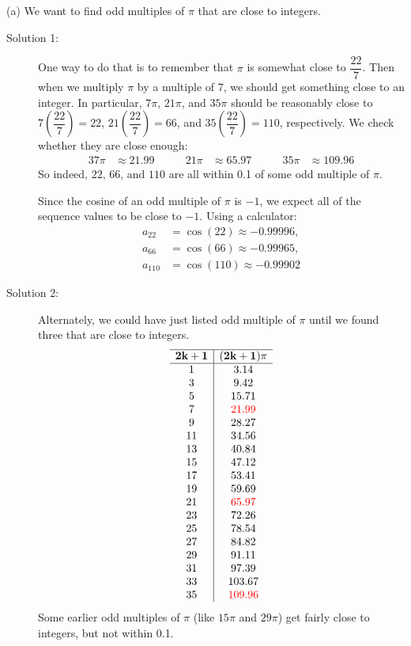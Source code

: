 \begin{solution}
\noindent (a) We want to find odd multiples of $\pi$ that are close to integers.
\begin{description}\item[Solution 1:]
One way to do that is to remember that $\pi$ is somewhat close to $\dfrac{22}{7}$. Then when we multiply $\pi$ by a multiple of 7, we should get something close to an integer. In particular, $7\pi$, $21\pi$, and $35\pi$ should be reasonably close to $7\left(\dfrac{22}{7}\right)=22$, $21\left(\dfrac{22}{7}\right)=66$, and $35\left(\dfrac{22}{7}\right)=110$, respectively. We check whether they are close enough:
\begin{alignat*}{3}
7\pi&\approx 21.99 &\qquad 21\pi &\approx 65.97 & \qquad 35\pi &\approx 109.96
\end{alignat*}
So indeed, $22$, $66$, and $110$ are all within 0.1 of some odd multiple of $\pi$.

Since the cosine of an odd multiple of $\pi$ is $-1$, we expect all of the sequence values to be close to $-1$. Using a calculator:
\begin{align*}a_{22} &= \cos(22) \approx -0.99996,\\
a_{66} &= \cos(66) \approx -0.99965,  \\
a_{110} &= \cos(110) \approx -0.99902
\end{align*}

\item[Solution 2:]
Alternately, we could have just listed odd multiple of $\pi$ until we found  three that are close to integers.
\[\begin{array}{c|c}
\hline
\mathbf{2k+1}&\mathbf{(2k+1)\pi}\\
\hline
1&3.14\\
3&9.42\\
5&15.71\\
7&\color{red}21.99\\
9&28.27\\
11&34.56\\
13&40.84\\
15&47.12\\
17&53.41\\
19&59.69\\
21&\color{red}65.97\\
23&72.26\\
25&78.54\\
27&84.82\\
29&91.11\\
31&97.39\\
33&103.67\\
35&\color{red}109.96
\end{array}\]
Some earlier odd multiples of $\pi$ (like $15\pi$ and $29\pi$) get fairly close to integers, but not within 0.1.
\end{description}


\end{solution}
